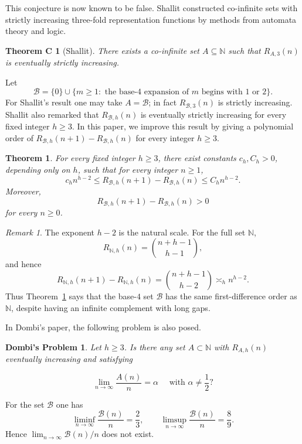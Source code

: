 \documentclass[11pt]{amsart}
\newtheorem{theorem}{Theorem}[section]
\newtheorem*{theoremC}{Theorem C}
\newtheorem*{problemD}{Dombi's Problem}
\theoremstyle{remark}
\newtheorem*{remarkintro}{Remark}
\theoremstyle{plain}
\newcommand{\BaseB}{\mathcal B}
\begin{document}
This conjecture is now known to be false. Shallit \cite{ShallitDombi} constructed co-infinite sets with strictly increasing three-fold representation functions by methods from automata theory and logic.

\begin{theoremC}[Shallit]
There exists a co-infinite set $A\subseteq \mathbb N$ such that $R_{A,3}(n)$ is eventually strictly increasing.
\end{theoremC}

Let
\[
\BaseB=\{0\}\cup\{m\ge 1:\text{ the base-4 expansion of }m\text{ begins with }1\text{ or }2\}.
\]
For Shallit's result one may take $A=\BaseB$; in fact $R_{\BaseB,3}(n)$ is strictly increasing.
Shallit also remarked that $R_{\BaseB,h}(n)$ is eventually strictly increasing for every fixed integer $h\ge 3$.
In this paper, we improve this result by giving a polynomial order of
$R_{\BaseB,h}(n+1)-R_{\BaseB,h}(n)$ for every integer $h\ge 3$.

\begin{theorem}\label{thm:main}
For every fixed integer $h\ge 3$, there exist constants $c_h,C_h>0$, depending only on $h$, such that for every integer $n\ge 1$,
\[
 c_h n^{h-2}\le R_{\BaseB,h}(n+1)-R_{\BaseB,h}(n)\le C_h n^{h-2}.
\]
Moreover,
\[
 R_{\BaseB,h}(n+1)-R_{\BaseB,h}(n)>0
\]
for every $n\ge 0$.
\end{theorem}

\begin{remarkintro}
The exponent $h-2$ is the natural scale. For the full set $\mathbb N$,
\[
R_{\mathbb N,h}(n)=\binom{n+h-1}{h-1},
\]
and hence
\[
R_{\mathbb N,h}(n+1)-R_{\mathbb N,h}(n)
=\binom{n+h-1}{h-2}\asymp_h n^{h-2}.
\]
Thus Theorem~\ref{thm:main} says that the base-$4$ set $\BaseB$ has the same first-difference order as $\mathbb N$, despite having an infinite complement with long gaps.
\end{remarkintro}

In Dombi's paper, the following problem is also posed.

\begin{problemD} Let $h \geq 3$. Is there any set $A \subset \mathbb{N}$ with $R_{A,h}(n)$ eventually increasing and satisfying

$$
\lim _{n \rightarrow \infty} \frac{A(n)}{n}=\alpha \quad \text { with } \alpha \neq \frac{1}{2} ?
$$
\end{problemD}

For the set $\BaseB$ one has
\[
\liminf_{n\to\infty}\frac{\BaseB(n)}{n}=\frac23,
\qquad
\limsup_{n\to\infty}\frac{\BaseB(n)}{n}=\frac89.
\]
Hence $\lim_{n\to\infty}\BaseB(n)/n$ does not exist.
\end{document}
